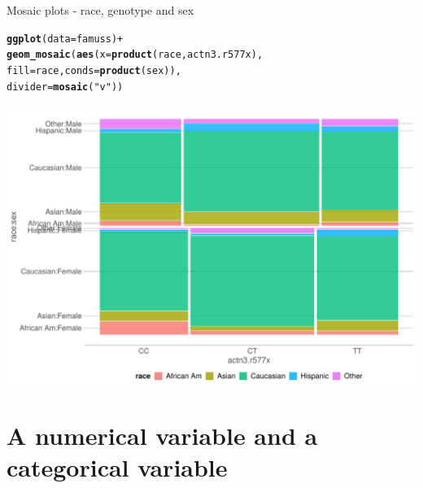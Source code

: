 \documentclass[10pt,handout]{beamer}\usepackage[]{graphicx}\usepackage[]{color}
\makeatletter
\def\maxwidth{ %
  \ifdim\Gin@nat@width>\linewidth
    \linewidth
  \else
    \Gin@nat@width
  \fi
}
\newcommand{\hlstr}[1]{\textcolor[rgb]{0.192,0.494,0.8}{#1}}%
\newcommand{\hlopt}[1]{\textcolor[rgb]{0,0,0}{#1}}%
\newcommand{\hlstd}[1]{\textcolor[rgb]{0.345,0.345,0.345}{#1}}%
\newcommand{\hlkwc}[1]{\textcolor[rgb]{0.333,0.667,0.333}{#1}}%
\newcommand{\hlkwd}[1]{\textcolor[rgb]{0.737,0.353,0.396}{\textbf{#1}}}%
\newenvironment{kframe}{%
 \def\at@end@of@kframe{}%
 \ifinner\ifhmode%
  \def\at@end@of@kframe{\end{minipage}}%
  \begin{minipage}{\columnwidth}%
 \fi\fi%
 \def\FrameCommand##1{\hskip\@totalleftmargin \hskip-\fboxsep
 \colorbox{shadecolor}{##1}\hskip-\fboxsep
     \hskip-\linewidth \hskip-\@totalleftmargin \hskip\columnwidth}%
 \MakeFramed {\advance\hsize-\width
   \@totalleftmargin\z@ \linewidth\hsize
   \@setminipage}}%
 {\par\unskip\endMakeFramed%
 \at@end@of@kframe}
\newenvironment{knitrout}{}{} %
\makeatother
\begin{document}
\begin{frame}[fragile]{Mosaic plots - race, genotype and sex}
\begin{knitrout}\tiny
{}\color{fgcolor}\begin{kframe}
\begin{alltt}
    \hlkwd{ggplot}\hlstd{(}\hlkwc{data} \hlstd{= famuss)} \hlopt{+}
      \hlkwd{geom_mosaic}\hlstd{(}\hlkwd{aes}\hlstd{(}\hlkwc{x} \hlstd{=} \hlkwd{product}\hlstd{(race, actn3.r577x),}
                      \hlkwc{fill} \hlstd{= race,} \hlkwc{conds} \hlstd{=} \hlkwd{product}\hlstd{(sex)),}
                      \hlkwc{divider} \hlstd{=} \hlkwd{mosaic}\hlstd{(}\hlstr{"v"}\hlstd{))}
\end{alltt}
\end{kframe}

{\centering \includegraphics[width=\maxwidth]{figure/mosaic-2-1} 

}



\end{knitrout}
	
\end{frame}



\section{A numerical variable and a categorical variable}
\end{document}
